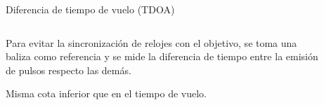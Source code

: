\documentclass[xcolor=table]{beamer}
\begin{document}

    \begin{frame}{Diferencia de tiempo de vuelo (TDOA)}
      \begin{columns}
        \begin{column}{0.5\textwidth}
          Para evitar la sincronización de relojes con el objetivo, se toma una baliza como referencia y se mide la diferencia de tiempo entre la emisión de pulsos respecto las demás.

          \vspace{0.5cm}
          Misma cota inferior que en el tiempo de vuelo.
        \end{column}
        \begin{column}{0.5\textwidth}  
          \begin{figure}[H]
            \centering
            \def\svgwidth{\linewidth}
            
            \label{fig:TDOA}
        \end{figure}
        \end{column}
        \end{columns}
    \end{frame}
\end{document}
